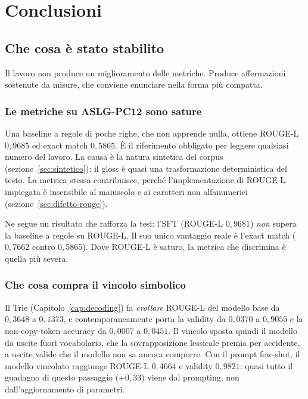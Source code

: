 \chapter{Conclusioni}
\label{cap:conclusioni}

\section{Che cosa è stato stabilito}

Il lavoro non produce un miglioramento delle metriche. Produce affermazioni
sostenute da misure, che conviene enunciare nella forma più compatta.

\subsection{Le metriche su ASLG-PC12 sono sature}

Una baseline a regole di poche righe, che non apprende nulla, ottiene ROUGE-L
$0{,}9685$ ed exact match $0{,}5865$. È il riferimento obbligato per leggere
qualsiasi numero del lavoro. La causa è la natura sintetica del corpus
(sezione~\ref{sec:sintetico}): il gloss è quasi una trasformazione
deterministica del testo. La metrica stessa contribuisce, perché l'implementazione
di ROUGE-L impiegata è insensibile al maiuscolo e ai caratteri non alfanumerici
(sezione~\ref{sec:difetto-rouge}).

Ne segue un risultato che rafforza la tesi: l'SFT (ROUGE-L $0{,}9681$) \emph{non}
supera la baseline a regole su ROUGE-L. Il suo unico vantaggio reale è l'exact
match ($0{,}7662$ contro $0{,}5865$). Dove ROUGE-L è saturo, la metrica che
discrimina è quella più severa.

\subsection{Che cosa compra il vincolo simbolico}

Il Trie (Capitolo~\ref{cap:decoding}) fa \emph{crollare} ROUGE-L del modello base
da $0{,}3648$ a $0{,}1373$, e contemporaneamente porta la validity da $0{,}0370$ a
$0{,}9055$ e la non-copy-token accuracy da $0{,}0007$ a $0{,}0451$. Il vincolo
sposta quindi il modello da uscite fuori vocabolario, che la sovrapposizione
lessicale premia per accidente, a uscite valide che il modello non sa ancora
comporre. Con il prompt few-shot, il modello vincolato raggiunge ROUGE-L
$0{,}4664$ e validity $0{,}9821$: quasi tutto il guadagno di questo passaggio
($+0{,}33$) viene dal prompting, non dall'aggiornamento di parametri.

